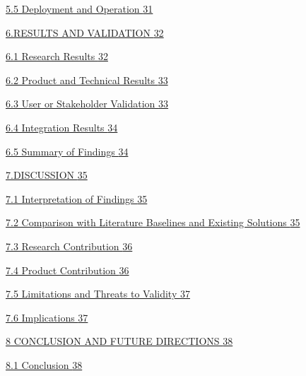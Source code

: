 \documentclass[
]{article}
\begin{document}
\protect\hyperlink{deployment-and-operation}{5.5 Deployment and
Operation \protect\hyperlink{deployment-and-operation}{31}}

\protect\hyperlink{results-and-validation}{6.RESULTS AND VALIDATION
\protect\hyperlink{results-and-validation}{32}}

\protect\hyperlink{research-results}{6.1 Research Results
\protect\hyperlink{research-results}{32}}

\protect\hyperlink{product-and-technical-results}{6.2 Product and
Technical Results \protect\hyperlink{product-and-technical-results}{33}}

\protect\hyperlink{user-or-stakeholder-validation}{6.3 User or
Stakeholder Validation
\protect\hyperlink{user-or-stakeholder-validation}{33}}

\protect\hyperlink{integration-results}{6.4 Integration Results
\protect\hyperlink{integration-results}{34}}

\protect\hyperlink{summary-of-findings}{6.5 Summary of Findings
\protect\hyperlink{summary-of-findings}{34}}

\protect\hyperlink{discussion}{7.DISCUSSION
\protect\hyperlink{discussion}{35}}

\protect\hyperlink{interpretation-of-findings}{7.1 Interpretation of
Findings \protect\hyperlink{interpretation-of-findings}{35}}

\protect\hyperlink{comparison-with-literature-baselines-and-existing-solutions}{7.2
Comparison with Literature Baselines and Existing Solutions
\protect\hyperlink{comparison-with-literature-baselines-and-existing-solutions}{35}}

\protect\hyperlink{research-contribution}{7.3 Research Contribution
\protect\hyperlink{research-contribution}{36}}

\protect\hyperlink{product-contribution}{7.4 Product Contribution
\protect\hyperlink{product-contribution}{36}}

\protect\hyperlink{limitations-and-threats-to-validity}{7.5 Limitations
and Threats to Validity
\protect\hyperlink{limitations-and-threats-to-validity}{37}}

\protect\hyperlink{implications}{7.6 Implications
\protect\hyperlink{implications}{37}}

\protect\hyperlink{conclusion-and-future-directions}{8 CONCLUSION AND
FUTURE DIRECTIONS
\protect\hyperlink{conclusion-and-future-directions}{38}}

\protect\hyperlink{conclusion}{8.1 Conclusion
\protect\hyperlink{conclusion}{38}}
\end{document}
